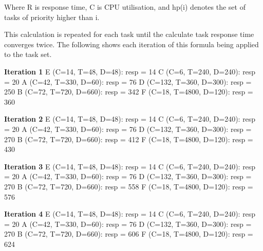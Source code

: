 \documentclass[]{report}
\begin{document}
			Where R is response time, C is CPU utilisation, and hp(i) denotes the set of tasks of priority higher than i.

			This calculation is repeated for each task until the calculate task response time converges twice. The following shows each iteration of this formula being applied to the task set.
			\medskip

			\textbf{Iteration 1} \newline
			E (C=14, T=48, D=48): resp = 14 \newline
			C (C=6, T=240, D=240): resp = 20 \newline
			A (C=42, T=330, D=60): resp = 76 \newline
			D (C=132, T=360, D=300): resp = 250 \newline
			B (C=72, T=720, D=660): resp = 342 \newline
			F (C=18, T=4800, D=120): resp = 360 \newline
	
			\textbf{Iteration 2} \newline
			E (C=14, T=48, D=48): resp = 14 \newline
			C (C=6, T=240, D=240): resp = 20 \newline
			A (C=42, T=330, D=60): resp = 76 \newline
			D (C=132, T=360, D=300): resp = 270 \newline
			B (C=72, T=720, D=660): resp = 412 \newline
			F (C=18, T=4800, D=120): resp = 430 \newline
	
			\textbf{Iteration 3} \newline
			E (C=14, T=48, D=48): resp = 14 \newline
			C (C=6, T=240, D=240): resp = 20 \newline
			A (C=42, T=330, D=60): resp = 76 \newline
			D (C=132, T=360, D=300): resp = 270 \newline
			B (C=72, T=720, D=660): resp = 558 \newline
			F (C=18, T=4800, D=120): resp = 576 \newline
	
			\textbf{Iteration 4} \newline
			E (C=14, T=48, D=48): resp = 14 \newline
			C (C=6, T=240, D=240): resp = 20 \newline
			A (C=42, T=330, D=60): resp = 76 \newline
			D (C=132, T=360, D=300): resp = 270 \newline
			B (C=72, T=720, D=660): resp = 606 \newline
			F (C=18, T=4800, D=120): resp = 624 \newline
	
\end{document}
